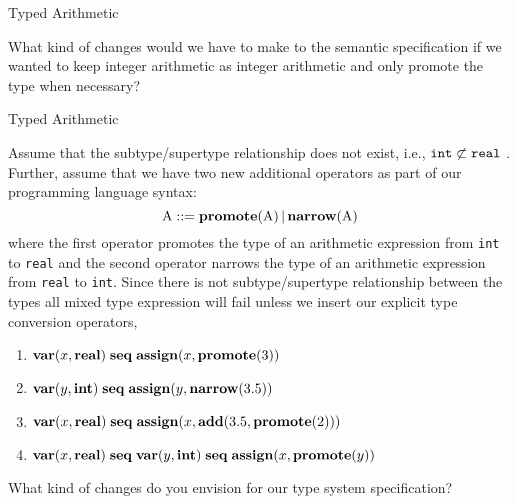 \documentclass{beamer}
\begin{document}
\begin{frame}[fragile]{Typed Arithmetic}

\small
What kind of changes would we have to make to the semantic specification if we
wanted to keep integer arithmetic as integer arithmetic and only promote the type when necessary?
\end{frame}

\begin{frame}[fragile]{Typed Arithmetic}

\small
Assume that the subtype/supertype relationship does not exist, i.e., ${\tt int} \not\subset {\tt real}$ .
Further, assume that we have two new additional operators as part of our programming language syntax:
\[
\mbox{A} ::= \mbox{\bf promote}(\mbox{A}) \,|\, \mbox{\bf narrow}(\mbox{A})
\]
where the first operator promotes the type of an arithmetic expression from {\tt int} to {\tt real} and the second
operator narrows the type of an arithmetic expression from {\tt real} to {\tt int}.  Since there is not subtype/supertype
relationship between the types all mixed type expression will fail unless we insert our explicit type conversion operators,
\begin{enumerate}
\item ${\bf var}(x,{\bf real}) \;{ \bf seq }\; {\bf assign}(x, \mbox{\bf promote}(3))$ 
\item ${\bf var}(y,{\bf int}) \;{ \bf seq }\; {\bf assign}(y, \mbox{\bf narrow}(3.5))$ 
\item ${\bf var}(x,{\bf real})\; { \bf seq } \;{\bf assign}(x, {\bf add}(3.5,\mbox{\bf promote}(2)))$
\item ${\bf var}(x,{\bf real})\; { \bf seq }\; {\bf var}(y,{\bf int})\; { \bf seq }  \;{\bf assign}(x, \mbox{\bf promote}(y))$ 
\end{enumerate}
What kind of changes do you envision for our type system specification?
\end{frame}
\end{document}
